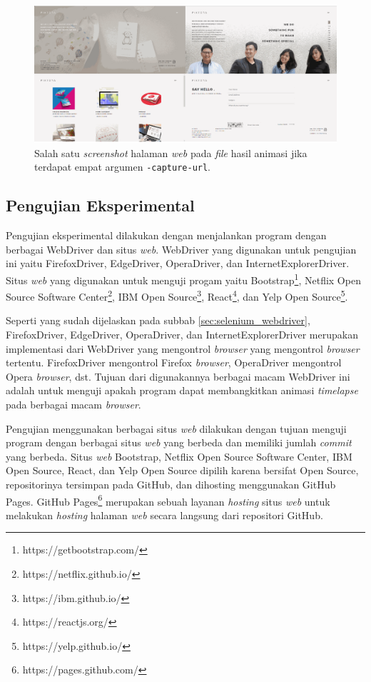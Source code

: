 \begin{figure}[H]
	\centering
		\includegraphics[scale=0.3]{Gambar/capture4.png}
	\caption{Salah satu \textit{screenshot} halaman \textit{web} pada \textit{file} hasil animasi jika terdapat empat argumen \texttt{-capture-url}.}
	\label{fig:capture4}
\end{figure}




\subsection{Pengujian Eksperimental}
\label{sec:pengujian_eksperimental} 
Pengujian eksperimental dilakukan dengan menjalankan program dengan berbagai WebDriver dan situs \textit{web}. 
WebDriver yang digunakan untuk pengujian ini yaitu FirefoxDriver, EdgeDriver, OperaDriver, dan InternetExplorerDriver. Situs \textit{web} yang digunakan untuk menguji progam yaitu Bootstrap\footnote{https://getbootstrap.com/}, Netflix Open Source Software Center\footnote{https://netflix.github.io/}, IBM Open Source\footnote{https://ibm.github.io/}, React\footnote{https://reactjs.org/}, dan Yelp Open Source\footnote{https://yelp.github.io/}. 

Seperti yang sudah dijelaskan pada subbab \ref{sec:selenium_webdriver}, FirefoxDriver, EdgeDriver, OperaDriver, dan InternetExplorerDriver merupakan implementasi dari WebDriver yang mengontrol \textit{browser} yang mengontrol \textit{browser} tertentu. FirefoxDriver mengontrol Firefox \textit{browser}, OperaDriver mengontrol Opera \textit{browser}, dst. Tujuan dari digunakannya berbagai macam WebDriver ini adalah untuk menguji apakah program dapat membangkitkan animasi \textit{timelapse} pada berbagai macam \textit{browser}.

Pengujian menggunakan berbagai situs \textit{web} dilakukan dengan tujuan menguji program dengan berbagai situs \textit{web} yang berbeda dan memiliki jumlah \textit{commit} yang berbeda. Situs \textit{web} Bootstrap, Netflix Open Source Software Center, IBM Open Source, React, dan Yelp Open Source  dipilih karena bersifat Open Source, repositorinya tersimpan pada GitHub, dan dihosting menggunakan GitHub Pages. GitHub Pages\footnote{https://pages.github.com/} merupakan sebuah layanan \textit{hosting} situs \textit{web} untuk melakukan \textit{hosting} halaman \textit{web} secara langsung dari repositori GitHub.     

